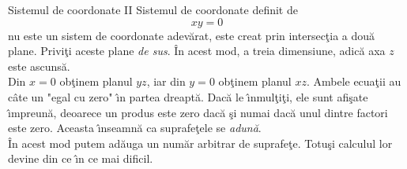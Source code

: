 \begin{surferPage}[Coordonate II]{Sistemul de coordonate II}
Sistemul de coordonate definit de 
\[xy=0\]
nu este un sistem de coordonate adev\u arat, este creat prin intersec\c tia a dou\u a plane. Privi\c ti aceste plane {\em de sus}. \^In acest mod, a treia dimensiune, adic\u a axa $z$ este ascuns\u a.
\\
\vspace{0.3cm}
Din $x=0$ ob\c tinem planul $yz$, iar din $y=0$ ob\c tinem planul $xz$. Ambele ecua\c tii au c\^ate un "egal cu zero" \^\i n partea dreapt\u a. Dac\u a le \^\i nmul\c ti\c ti, ele sunt afi\c sate \^\i mpreun\u a, deoarece un produs este zero dac\u a \c si numai dac\u a unul dintre factori este zero. Aceasta \^\i nseamn\u a ca suprafe\c tele se {\em adun\u a}.
\\
\^In acest mod putem ad\u auga un num\u ar arbitrar de suprafe\c te. Totu\c si calculul lor devine din ce \^\i n ce mai dificil.
\end{surferPage}